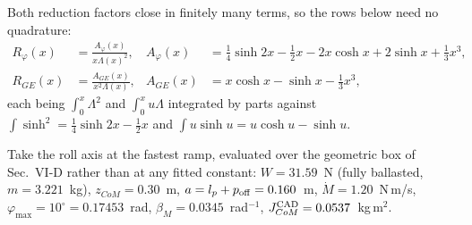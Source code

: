 \documentclass[11pt]{article}
\begin{document}
Both reduction factors close in finitely many terms, so the rows below
need no quadrature:
\begin{equation}
\begin{aligned}
  R_\varphi(x) &= \frac{A_\varphi(x)}{x\Lambda(x)^2}, &
  A_\varphi(x) &= \tfrac14\sinh 2x - \tfrac12 x
                  - 2x\cosh x + 2\sinh x + \tfrac13x^3, \\[2pt]
  R_{GE}(x) &= \frac{A_{GE}(x)}{x^{2}\Lambda(x)}, &
  A_{GE}(x) &= x\cosh x - \sinh x - \tfrac13x^3 ,
\end{aligned}
  \tag{D.15}
\end{equation}
each being $\int_0^x\Lambda^2$ and $\int_0^x u\Lambda$ integrated by
parts against $\int\sinh^2 = \tfrac14\sinh 2x - \tfrac12x$ and
$\int u\sinh u = u\cosh u - \sinh u$.

Take the roll axis at the fastest ramp, evaluated over the geometric
box of Sec.~VI-D rather than at any fitted constant: $W = 31.59$~N
(fully ballasted, $m = 3.221$~kg), $z_{CoM} = 0.30$~m, $a = l_p + p_{\rm off}
= 0.160$~m, $\dot M = 1.20$~N\,m/s, $\varphi_{\max} = 10^\circ =
0.17453$~rad, $\beta_M = 0.0345$~rad$^{-1}$, $J_{CoM}^{\rm CAD} =
0.0537$~kg\,m$^2$.
\end{document}
